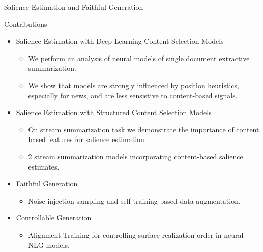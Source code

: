 \begin{frame}{Salience Estimation and Faithful Generation}
\begin{itemize}
\end{itemize}

\end{frame}

\begin{frame}{Contributions}
    \begin{itemize}
        \item Salience Estimation with Deep Learning Content Selection Models
            \begin{itemize}
                \item We perform an analysis of neural models of single document extractive summarization.
                \item We show that models are strongly influenced by  position heuristics, especially for news, and are less sensistive to content-based signals.
            \end{itemize}
            \vspace{5pt}
        \item<2-> Salience Estimation with Structured Content Selection Models 
            \begin{itemize}
                \item  On stream summarization task we demonstrate the importance of content based features for salience estimation
                \item 2 stream summarization models incorporating content-based salience estimates.
            \end{itemize}
            \vspace{10pt}
        \item<3-> Faithful Generation
        \begin{itemize}
            \item Noise-injection sampling and self-training based data augmentation.
        \end{itemize}
            \vspace{5pt}
        \item<4-> Controllable Generation
        \begin{itemize}
        \item Alignment Training for controlling surface realization order in neural NLG models.
        \end{itemize}
    \end{itemize}
\end{frame}

